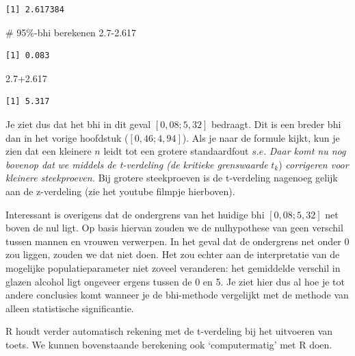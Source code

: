 \documentclass[
  letterpaper,
  DIV=11,
  numbers=noendperiod]{scrreprt}
\newenvironment{Shaded}{\begin{snugshade}}{\end{snugshade}}
\newcommand{\CommentTok}[1]{\textcolor[rgb]{0.37,0.37,0.37}{#1}}
\newcommand{\FloatTok}[1]{\textcolor[rgb]{0.68,0.00,0.00}{#1}}
\begin{document}
\begin{verbatim}
[1] 2.617384
\end{verbatim}

\begin{Shaded}
\begin{Highlighting}[]
\CommentTok{\# 95\%{-}bhi berekenen}
\FloatTok{2.7{-}2.617}
\end{Highlighting}
\end{Shaded}

\begin{verbatim}
[1] 0.083
\end{verbatim}

\begin{Shaded}
\begin{Highlighting}[]
\FloatTok{2.7+2.617}
\end{Highlighting}
\end{Shaded}

\begin{verbatim}
[1] 5.317
\end{verbatim}

Je ziet dus dat het bhi in dit geval \([0,08; 5,32]\) bedraagt. Dit is
een breder bhi dan in het vorige hoofdstuk (\([0,46; 4,94]\)). Als je
naar de formule kijkt, kun je zien dat een kleinere \(n\) leidt tot een
grotere standaardfout \(s.e.\) \emph{Daar komt nu nog bovenop dat}
\emph{we middels de t-verdeling (de kritieke grenswaarde} \(t_k\))
\emph{corrigeren voor kleinere steekproeven.} Bij grotere steekproeven
is de t-verdeling nagenoeg gelijk aan de z-verdeling (zie het youtube
filmpje hierboven).

Interessant is overigens dat de ondergrens van het huidige bhi
\([0,08; 5,32]\) net boven de nul ligt. Op basis hiervan zouden we de
nulhypothese van geen verschil tussen mannen en vrouwen verwerpen. In
het geval dat de ondergrens net onder 0 zou liggen, zouden we dat niet
doen. Het zou echter aan de interpretatie van de mogelijke
populatieparameter niet zoveel veranderen: het gemiddelde verschil in
glazen alcohol ligt ongeveer ergens tussen de 0 en 5. Je ziet hier dus
al hoe je tot andere conclusies komt wanneer je de bhi-methode
vergelijkt met de methode van alleen statistische significantie.

R houdt verder automatisch rekening met de t-verdeling bij het uitvoeren
van toets. We kunnen bovenstaande berekening ook `computermatig' met R
doen.
\end{document}
